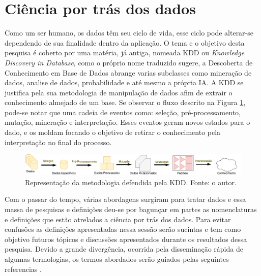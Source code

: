 \section{Ciência por trás dos dados}
Como um ser humano, os dados têm seu ciclo de vida, esse ciclo pode alterar-se dependendo de sua finalidade dentro da aplicação. O tema e o objetivo desta pesquisa é coberto por uma matéria, já antiga, nomeada KDD ou \textit{Knowledge Discovery in Database}, como o próprio nome traduzido sugere, a Descoberta de Conhecimento em Base de Dados abrange varias subclasses como mineração de dados, analise de dados, probabilidade e até mesmo a própria IA. A KDD se justifica pela sua metodologia de manipulação de dados afim de extrair o conhecimento almejado de um base. Se observar o fluxo descrito na Figura \ref{fig:kdd}, pode-se notar que uma cadeia de eventos como: seleção, pré-processamento, mutação, mineração e interpretação. Esses eventos geram novos estados para o dado, e os moldam focando o objetivo de retirar o conhecimento pela interpretação no final do processo.

\begin{figure}
    \centering
    \includegraphics[width=.8\textwidth]{imagens/kdd.png}
    \caption{Representação da metodologia defendida pela KDD. Fonte: o autor.}
    \label{fig:kdd}
\end{figure}

Com o passar do tempo, várias abordagens surgiram para tratar dados e essa massa de pesquisas e definições deu-se por bagunçar em partes as nomenclaturas e definições que estão atrelados a ciência por trás dos dados. Para evitar confusões as definições apresentadas nessa sessão serão sucintas e tem como objetivo futuros tópicos e discussões apresentados durante os resultados dessa pesquisa. Devido a grande divergência, ocorrida pela disseminação rápida de algumas termologias, os termos abordados serão guiados pelas seguintes referencias \cite{laender2002brief, fayyad1996kdd, hand2007principles}.




